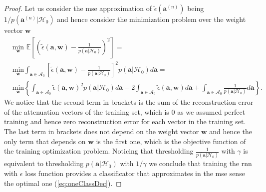 \documentclass[draftcls,onecolumn,12pt]{IEEEtran}
\newcommand{\Exp}[1]{\mathbb{E}\left[#1\right]}
\begin{document}
\begin{proof}
Let us consider the \ac{mse} approximation of $\tilde{\epsilon}(\bm{a}^{(n)})$ being $1/p(\bm{a}^{(n)}|\mathcal{H}_0)$ and hence consider the minimization problem over the weight vector $\bm{w}$
\begin{equation}
	\begin{aligned}
		&\underset{\mathbf{w}}{\text{min}}\,\, \Exp{ \left( \tilde{\epsilon}(\mathbf{a},\mathbf{w}) - \frac{1}{p(\mathbf{a}|\mathcal{H}_0)}\right) ^2} = \\
		&\underset{\mathbf{w}}{\text{min}} \int_{\bm{a} \in \mathcal{A}_0} \left[ \tilde{\epsilon}(\mathbf{a},\mathbf{w}) - \frac{1}{p(\mathbf{a}|\mathcal{H}_0)} \right] ^2 p(\mathbf{a}|\mathcal{H}_0) d\mathbf{a} = \\
		&\underset{\mathbf{w}}{\text{min}} \left\lbrace \int_{\bm{a} \in \mathcal{A}_0} \tilde{\epsilon}(\mathbf{a},\mathbf{w})^2 p(\mathbf{a}|\mathcal{H}_0) d\mathbf{a}
		-2\int_{\bm{a} \in \mathcal{A}_0} \tilde{\epsilon}(\mathbf{a},\mathbf{w}) d\mathbf{a}
		+ \int_{\bm{a} \in \mathcal{A}_0} \frac{1}{p(\mathbf{a}|\mathcal{H}_0)} d\mathbf{a} \right\rbrace.
	\end{aligned}	
\end{equation}
We notice that the second term in brackets is the sum of the reconstruction error of the attenuation vectors of the training set, which is $0$ as we assumed perfect training and hence zero reconstruction error for each vector in the training set. The last term in brackets does not depend on the weight vector $\bm{w}$ and hence the only term that depends on $\bm{w}$ is the first one, which is the objective function of the training optimization problem. Noticing that thresholding $\frac{1}{p(\mathbf{a}|\mathcal{H}_0)}$ with $\gamma$ is equivalent to thresholding $p(\mathbf{a}|\mathcal{H}_0)$ with $1/\gamma$ we conclude that training the \ac{rnn} with $\epsilon$ loss function provides a classificator that approximates in the \ac{mse} sense the optimal one (\ref{eq:oneClassDec}).
\end{proof}
\end{document}
